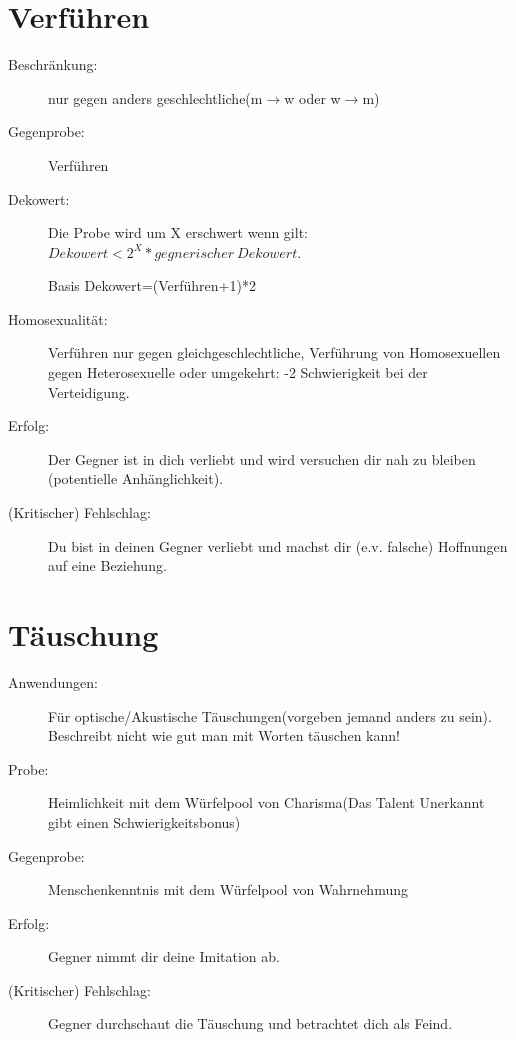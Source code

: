 \section{Verführen}
\begin{description}
\item[Beschränkung:] nur gegen anders geschlechtliche(m$\rightarrow$w oder w$\rightarrow$m)

\item[Gegenprobe:] Verführen

\item[Dekowert:]Die Probe wird um X erschwert wenn gilt:$Dekowert<2^X*gegnerischer\ Dekowert$.

Basis Dekowert=(Verführen+1)*2

\item[Homosexualität:] Verführen nur gegen gleichgeschlechtliche, Verführung von Homosexuellen gegen Heterosexuelle oder umgekehrt: -2 Schwierigkeit bei der Verteidigung.

\item[Erfolg:] Der Gegner ist in dich verliebt und wird versuchen dir nah zu bleiben (potentielle Anhänglichkeit).

\item[(Kritischer) Fehlschlag:] Du bist in deinen Gegner verliebt und machst dir (e.v. falsche) Hoffnungen auf eine Beziehung.
\end{description}

\section{Täuschung}
\begin{description}
\item[Anwendungen:] Für optische/Akustische Täuschungen(vorgeben jemand anders zu sein). Beschreibt nicht wie gut man mit Worten täuschen kann!

\item[Probe:] Heimlichkeit mit dem Würfelpool von Charisma(Das Talent Unerkannt gibt einen Schwierigkeitsbonus)

\item[Gegenprobe:] Menschenkenntnis mit dem Würfelpool von Wahrnehmung

\item[Erfolg:] Gegner nimmt dir deine Imitation ab.

\item[(Kritischer) Fehlschlag:] Gegner durchschaut die Täuschung und betrachtet dich als Feind.
\end{description}

